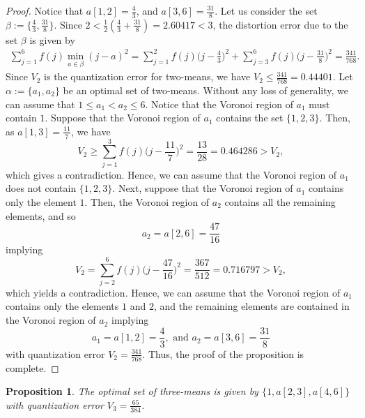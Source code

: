 \documentclass[12pt, reqno]{amsart}
\theoremstyle{plain}
\newtheorem{prop}[subsection]{Proposition}
\theoremstyle{definition}
\newcommand{\set}[1]{\{#1\}}%
\newcommand{\ga}{\alpha}
\newcommand{\gb}{\beta}
\newcommand{\te}{\text}%
\begin{document}
\begin{proof} Notice that $a[1,2]=\frac 43$, and $a[3,6]=\frac {31} 8$.
Let us consider the set $\gb:=\set{\frac 43, \frac {31}8}$. Since $2<\frac 12(\frac 43+\frac {31}8)=2.60417<3$,
the distortion error due to the set $\gb$ is given by
\begin{align*} \sum_{j=1}^6 f(j)\min_{a\in \gb} (j-a)^2=\sum _{j=1}^2 f(j)\Big(j-\frac{4}{3}\Big)^2+\sum _{j=3}^6f(j)\Big(j-\frac{31}{8}\Big)^2=\frac{341}{768}.
\end{align*}
Since $V_2$ is the quantization error for two-means, we have $V_2\leq \frac{341}{768}=0.44401$.
Let $\ga:=\set{a_1, a_2}$ be an optimal set of two-means. Without any loss of generality, we can assume that $1\leq a_1<a_2\leq 6$. Notice that the Voronoi region of $a_1$ must contain $1$. Suppose that the Voronoi region of $a_1$ contains the set $\set{1,2,3}$. Then, as $a[1,3]=\frac{11}{7}$, we have
\[V_2\geq \sum _{j=1}^3f(j)\Big(j-\frac {11}{7}\Big)^2=\frac{13}{28}=0.464286>V_2,\]
which gives a contradiction. Hence, we can assume that the Voronoi region of $a_1$ does not contain $\set{1,2,3}$. Next, suppose that the Voronoi region of $a_1$ contains only the element $1$. Then, the Voronoi region of $a_2$ contains all the remaining elements, and so
\[a_2=a[2, 6]=\frac{47}{16}\]
implying
\[V_2=\sum _{j=2}^6f(j)\Big(j-\frac{47}{16}\Big)^2=\frac{367}{512}=0.716797>V_2,\]
which yields a contradiction.
Hence, we can assume that the Voronoi region of $a_1$ contains only the elements $1$ and $2$, and the remaining elements are contained in the Voronoi region of $a_2$ implying
\[a_1=a[1,2]=\frac 43, \te{ and } a_2=a[3,6]=\frac{31}{8}\]
with quantization error $V_2=\frac{341}{768}$. Thus, the proof of the proposition is complete.
\end{proof}
\begin{prop} \label{prop13}
The optimal set of three-means is given by $\set{1, a[2,3], a[4,6]}$ with quantization error $V_3=\frac{65}{384}$.
\end{prop}
\end{document}
